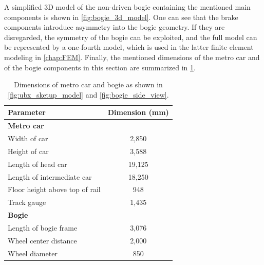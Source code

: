 A simplified 3D model of the non-driven bogie containing the mentioned main components is shown in \cref{fig:bogie_3d_model}. One can see that the brake components introduce asymmetry into the bogie geometry. If they are disregarded, the symmetry of the bogie can be exploited, and the full model can be represented by a one-fourth model, which is used in the latter finite element modeling in \cref{chap:FEM}.
Finally, the mentioned dimensions of the metro car and of the bogie components in this section are summarized in \cref{tab:vehicle_dimensions}.
\begin{table}[H]
	\caption{Dimensions of metro car and bogie as shown in \cref{fig:ubx_sketup_model} and \cref{fig:bogie_side_view}.}
	\centering
	\begin{tabular}{lc}
		\toprule
		Parameter                    	   &  Dimension (mm)    \\
		\midrule
		\textbf{Metro car} 				   & 		 \\
		Width of car                       & 2,850   \\
		Height of car  					   & 3,588   \\
		Length of head car  			   & 19,125  \\
		Length of intermediate car 		   & 18,250  \\
		Floor height above top of rail     & 948     \\
		Track gauge              		   & 1,435   \\
		\textbf{Bogie} 					   & 		 \\
		Length of bogie frame    		   & 3,076   \\
		Wheel center distance 			   & 2,000   \\ 
		Wheel diameter  				   & 850     \\ 
		\bottomrule
	\end{tabular}
	\label{tab:vehicle_dimensions}
\end{table}